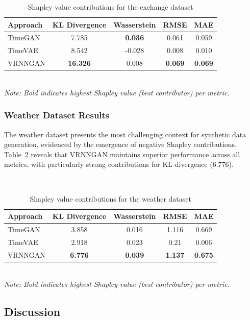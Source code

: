 \documentclass{article}
\begin{document}
\begin{table}[H]
\centering
\caption{Shapley value contributions for the exchange dataset}
\label{tab:shapley_exchange}
\begin{tabular}{lcccc}
\toprule
\textbf{Approach} & \textbf{KL Divergence} & \textbf{Wasserstein} & \textbf{RMSE} & \textbf{MAE} \\
\midrule
TimeGAN & 7.785 & \textbf{0.036} & 0.061 & 0.059 \\
TimeVAE & 8.542 & -0.028 & 0.008 & 0.010 \\
VRNNGAN & \textbf{16.326} & 0.008 & \textbf{0.069} & \textbf{0.069} \\
\bottomrule
\end{tabular}
\\[0.5em]
\footnotesize
\textit{Note: Bold indicates highest Shapley value (best contributor) per metric.}
\end{table}

\subsubsection{Weather Dataset Results}
The weather dataset presents the most challenging context for synthetic data generation, evidenced by the emergence of negative Shapley contributions. Table~\ref{tab:shapley_weather} reveals that VRNNGAN maintains superior performance across all metrics, with particularly strong contributions for KL divergence (6.776).

\begin{table}[H]
\centering
\caption{Shapley value contributions for the weather dataset}
~\label{tab:shapley_weather}
\begin{tabular}{lcccc}
\toprule
\textbf{Approach} & \textbf{KL Divergence} & \textbf{Wasserstein} & \textbf{RMSE} & \textbf{MAE} \\
\midrule
TimeGAN & 3.858 & 0.016 & 1.116 & 0.669 \\
TimeVAE & 2.918 & 0.023 & 0.21 & 0.006 \\
VRNNGAN & \textbf{6.776} & \textbf{0.039} & \textbf{1.137} & \textbf{0.675} \\
\bottomrule
\end{tabular}
\\[0.5em]
\footnotesize
\textit{Note: Bold indicates highest Shapley value (best contributor) per metric.}
\end{table}

\subsection{Discussion}
\end{document}
